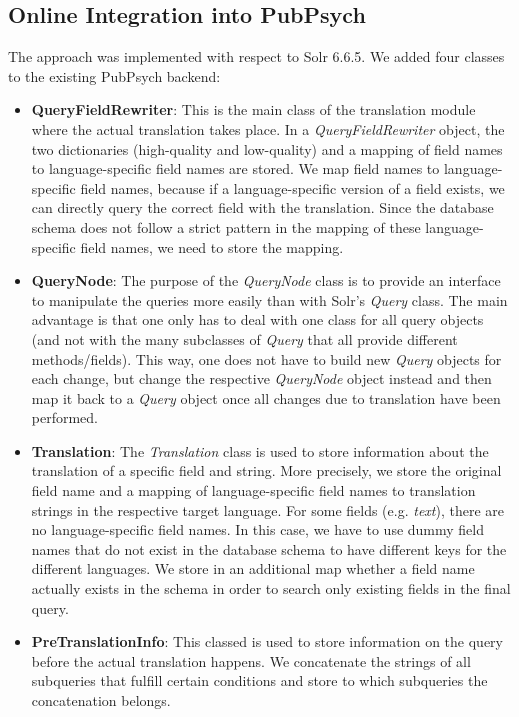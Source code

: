 \documentclass[a4paper,11pt]{article}
\begin{document}
	\subsection{Online Integration into PubPsych}
	\label{ss:integration}
	The approach was implemented with respect to Solr 6.6.5. We added four classes to the existing PubPsych backend:
	\begin{itemize}
		\item \textbf{QueryFieldRewriter}: This is the main class of the translation module where the actual translation takes place. In a \textit{QueryFieldRewriter} object, the two dictionaries (high-quality and low-quality) and a mapping of field names to language-specific field names are stored. We map field names to language-specific field names, because if a language-specific version of a field exists, we can directly query the correct field with the translation. Since the database schema does not follow a strict pattern in the mapping of these language-specific field names, we need to store the mapping.
		\item \textbf{QueryNode}: The purpose of the \textit{QueryNode} class is to provide an interface to manipulate the queries more easily than with Solr’s \textit{Query} class. The main advantage is that one only has to deal with one class for all query objects (and not with the many subclasses of \textit{Query} that all provide different methods/fields). This way, one does not have to build new \textit{Query} objects for each change, but change the respective \textit{QueryNode} object instead and then map it back to a \textit{Query} object once all changes due to translation have been performed.
		\item \textbf{Translation}: The \textit{Translation} class is used to store information about the translation of a specific field and string. More precisely, we store the original field name and a mapping of language-specific field names to translation strings in the respective target language. For some fields (e.g. \textit{text}), there are no language-specific field names. In this case, we have to use dummy field names that do not exist in the database schema to have different keys for the different languages. We store in an additional map whether a field name actually exists in the schema in order to search only existing fields in the final query.
		\item \textbf{PreTranslationInfo}: This classed is used to store information on the query before the actual translation happens. We concatenate the strings of all subqueries that fulfill certain conditions and store to which subqueries the concatenation belongs. 
	\end{itemize}
\end{document}
